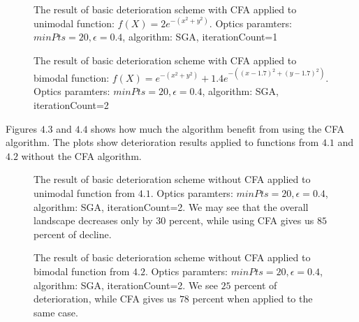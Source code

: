 \begin{figure}
  \centering
  \caption{The result of basic deterioration scheme with CFA 
  applied to unimodal function: $f(X) = 2e^{-(x^2 +y^2)}$.
  Optics paramters: $minPts=20, \epsilon=0.4$, algorithm: SGA, iterationCount=1}
  \label{det1}
\end{figure}

\begin{figure}
  \centering
  \caption{The result of basic deterioration scheme with CFA 
  applied to bimodal function: $f(X) = e^{-(x^2 + y^2)}+1.4e^{-((x-1.7)^2 +
  (y-1.7)^2)}$. Optics paramters: $minPts=20, \epsilon=0.4$, algorithm: SGA, iterationCount=2}
  \label{det2}
\end{figure}

Figures $4.3$ and $4.4$ shows how much the algorithm benefit from using
the CFA algorithm. The plots show deterioration results applied to
functions from $4.1$ and $4.2$ without the CFA algorithm.

\begin{figure}
  \centering
  \caption{The result of basic deterioration scheme without CFA 
  applied to unimodal function from $4.1$. Optics paramters: $minPts=20,
  \epsilon=0.4$, algorithm: SGA, iterationCount=2. We may see that the 
  overall landscape decreases only by $30$ percent, while using CFA
  gives us $85$ percent of decline.}
  \label{det3}
\end{figure}

\begin{figure}
  \centering
  \caption{The result of basic deterioration scheme without CFA 
  applied to bimodal function from $4.2$. Optics paramters: $minPts=20,
  \epsilon=0.4$, algorithm: SGA, iterationCount=2. We see $25$ percent
  of deterioration, while CFA gives us $78$ percent when applied to the same
  case.}
  \label{det3}
\end{figure}

